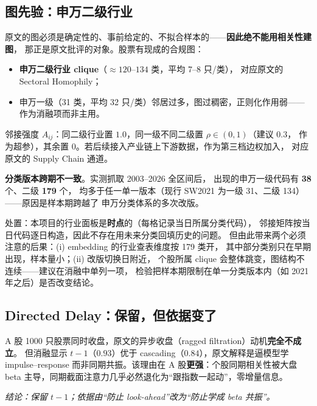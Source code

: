 \documentclass[11pt, a4paper]{ctexart}
\begin{document}
\subsection{图先验：申万二级行业}

原文的图必须是确定性的、事前给定的、不拟合样本的——\textbf{因此绝不能用相关性建图}，
那正是原文批评的对象。股票有现成的合规图：

\begin{itemize}
  \item \textbf{申万二级行业 clique}（$\approx 120$--$134$ 类，平均 7--8 只/类），
        对应原文的 Sectoral Homophily；
  \item 申万一级（31 类，平均 32 只/类）邻居过多，图过稠密，正则化作用弱——
        作为消融项而非主用。
\end{itemize}
邻接强度 $A_{ij}$：同二级行业置 $1.0$，同一级不同二级置 $\rho \in (0,1)$（建议 $0.3$，
作为超参），其余置 $0$。若后续接入产业链上下游数据，作为第三档边权加入，
对应原文的 Supply Chain 通道。

\begin{warnbox}
\textbf{分类版本跨期不一致}。实测抓取 2003--2026 全区间后，
出现的申万一级代码有 \textbf{38} 个、二级 \textbf{179} 个，
均多于任一单一版本（现行 SW2021 为一级 31、二级 134）——原因是样本期跨越了
申万分类体系的多次改版。

处置：本项目的行业面板是\textbf{时点}的（每格记录当日所属分类代码），
邻接矩阵按当日代码逐日构造，因此不存在用未来分类回填历史的问题。
但由此带来两个必须注意的后果：(i) embedding 的行业查表维度按 179 类开，
其中部分类别只在早期出现，样本量小；(ii) 改版切换日附近，
个股所属 clique 会整体跳变，图结构不连续——建议在消融中单列一项，
检验把样本期限制在单一分类版本内（如 2021 年之后）是否改变结论。
\end{warnbox}

\subsection{Directed Delay：保留，但依据变了}

A 股 1000 只股票同时收盘，原文的异步收盘（ragged filtration）动机\textbf{完全不成立}。
但消融显示 $t-1$（$0.93$）优于 cascading（$0.84$），原文解释是逼模型学
impulse--response 而非同期共振。该理由在 A 股\textbf{更强}：个股同期相关性被大盘
beta 主导，同期截面注意力几乎必然退化为“跟指数一起动”，零增量信息。

\begin{center}
\emph{结论：保留 $t-1$；依据由“防止 look-ahead”改为“防止学成 beta 共振”。}
\end{center}
\end{document}
